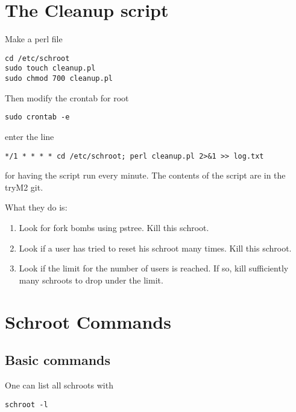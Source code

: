 \documentclass[a4paper]{book}
\begin{document}
\section{The Cleanup script}

Make a perl file

\begin{verbatim}
cd /etc/schroot
sudo touch cleanup.pl
sudo chmod 700 cleanup.pl
\end{verbatim}

Then modify the crontab for root

\begin{verbatim}
sudo crontab -e
\end{verbatim}

enter the line

\begin{verbatim}
*/1 * * * * cd /etc/schroot; perl cleanup.pl 2>&1 >> log.txt
\end{verbatim}

for having the script run every minute.
The contents of the script are in the tryM2 git.

What they do is:
\begin{enumerate}
\item Look for fork bombs using pstree. Kill this schroot.
\item Look if a user has tried to reset his schroot many times. Kill this schroot.
\item Look if the limit for the number of users is reached. If so, kill
  sufficiently many schroots to drop under the limit.
\end{enumerate}
\section{Schroot Commands}
\subsection{Basic commands}
One can list all schroots with

\begin{verbatim}
schroot -l
\end{verbatim}
\end{document}

